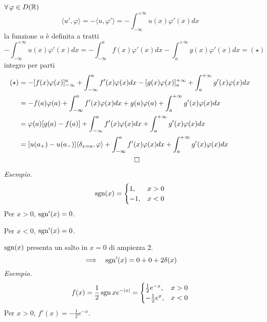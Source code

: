 $\forall \varphi \in D(\RR)$
\begin{equation*}
\langle u', \varphi \rangle = - \langle u, \varphi'\rangle = - \int^{+ \infty}_{- \infty} u(x) \varphi'(x) dx
\end{equation*}
la funzione $u$ è definita a tratti
\begin{equation*}
- \int^{+ \infty}_{- \infty} u(x) \varphi'(x) dx = -\int^{a}_{- \infty} f(x) \varphi'(x) dx - \int^{+ \infty}_{a} g(x) \varphi'(x) dx = (\star)
\end{equation*}
integro per parti
\begin{gather*}
\begin{aligned}
(\star) & = - [ f(x) \varphi (x)]^{a}_{- \infty} + \int^{a}_{- \infty} f'(x) \varphi (x) dx - [ g(x) \varphi (x)]^{+ \infty}_{a} + \int^{+ \infty}_{a} g'(x) \varphi (x) dx\\
 & = - f(a) \varphi (a) + \int^{a}_{- \infty} f'(x) \varphi (x) dx + g(a) \varphi (a) + \int^{+ \infty}_{a} g'(x) \varphi (x) dx\\
 & = \varphi (a)[ g(a) - f(a)] + \int^{a}_{- \infty} f'(x) \varphi (x) dx + \int^{+ \infty}_{a} g'(x) \varphi (x) dx\\
 & = [ u(a_{+}) - u(a_{-})] \langle \delta_{x = a}, \varphi \rangle + \int^{a}_{- \infty} f'(x) \varphi (x) dx + \int^{+ \infty}_{a} g'(x) \varphi (x) dx
\end{aligned}\\
\qed
\end{gather*}
\textit{Esempio.}
\begin{equation*}
\operatorname{sgn}(x) =
\begin{cases}
1, & x > 0\\
- 1, & x < 0
\end{cases}
\end{equation*}
Per $x > 0$, $\operatorname{sgn}'(x) = 0$.

Per $x < 0$, $\operatorname{sgn}'(x) = 0$.

$\operatorname{sgn}(x)$ presenta un salto in $x = 0$ di ampiezza $2$.
\begin{equation*}
\implies \ \ \operatorname{sgn}'(x) = 0 + 0 + 2\delta (x)
\end{equation*}
\textit{Esempio.}
\begin{equation*}
f(x) = \frac{1}{2}\operatorname{sgn} xe^{- | x|} =
\begin{cases}
\frac{1}{2} e^{- x}, & x > 0\\
- \frac{1}{2} e^{x}, & x < 0
\end{cases}
\end{equation*}
Per $x > 0$, $f'(x) = - \frac{1}{2} e^{- x}$.

